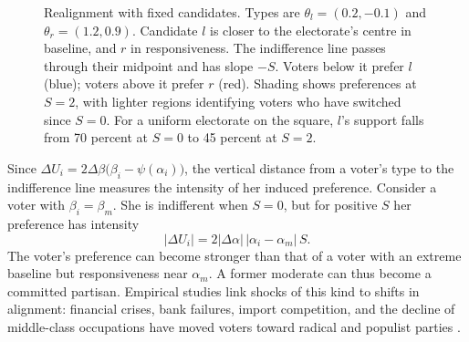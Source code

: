 \documentclass[12pt,letterpaper]{article}
\begin{document}
\begin{figure}[t]
\centering
{}
\caption{Realignment with fixed candidates. Types are $\theta_l=(0.2,-0.1)$ and $\theta_r=(1.2,0.9)$. Candidate $l$ is closer to the electorate's centre in baseline, and $r$ in responsiveness. The indifference line passes through their midpoint and has slope $-S$. Voters below it prefer $l$ (blue); voters above it prefer $r$ (red). Shading shows preferences at $S=2$, with lighter regions identifying voters who have switched since $S=0$. For a uniform electorate on the square, $l$'s support falls from 70 percent at $S=0$ to 45 percent at $S=2$.}
\label{fig:realign}
\end{figure}

Since $\Delta U_i=2\Delta\beta\big(\beta_i-\psi(\alpha_i)\big)$, the vertical distance from a voter's type to the indifference line measures the intensity of her induced preference. Consider a voter with $\beta_i=\beta_m$. She is indifferent when $S=0$, but for positive $S$ her preference has intensity
\[
|\Delta U_i|=2|\Delta\alpha|\,|\alpha_i-\alpha_m|\,S.
\]
The voter's preference can become stronger than that of a voter with an extreme baseline but responsiveness near $\alpha_m$. A former moderate can thus become a committed partisan. Empirical studies link shocks of this kind to shifts in alignment: financial crises, bank failures, import competition, and the decline of middle-class occupations have moved voters toward radical and populist parties \citep{Funke2016,Doerr2022,ColantoneStanig2018,Kurer2020,Algan2017}.
\end{document}
